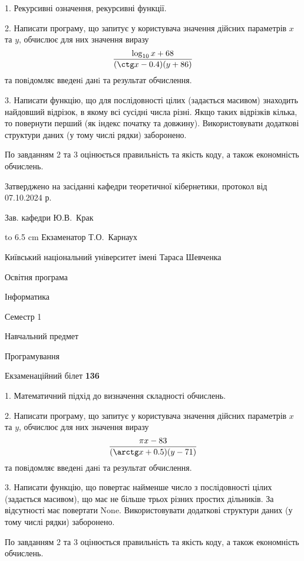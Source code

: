 \documentclass[12pt, ukrainian]{article}
\begin{document}
{%
1. Рекурсивні означення, рекурсивні функції.%
\par
2. Написати програму, що запитує у користувача значення дійсних параметрів $x$ та $y$, обчислює для них значення виразу 
$$\frac{\log_{10} x + 68}{(\ctg x - 0.4) (y + 86)}$$ 
та повiдомляє введенi данi та результат обчислення.

\par
3. Написати функцію, що для послідовності цілих (задається масивом) знаходить найдовший відрізок, в якому всі сусідні числа різні. Якщо таких відрізків кілька, то повернути перший (як індекс початку та довжину). Використовувати додаткові структури даних (у тому числі рядки) заборонено.

По завданням 2 та 3 оцінюється правильність та якість коду, а також економність обчислень.

}
{\smallskip\smallskip \begin {scriptsize} Затверджено на засіданні кафедри теоретичної кібернетики, протокол   від   07.10.2024 р.\par\smallskip\smallskip\smallskip\smallskip
{\parbox {6.5 cm} {Зав. кафедри \dotfill Ю.В.~Крак}}\hspace {0.7cm} {\hbox to 6.5 cm { Екзаменатор \dotfill Т.О.~Карнаух}} \end{scriptsize}}
\newpage
{{\begin {scriptsize}\par
{ \center  Київський національний університет імені Тараса Шевченка \par}
{\parbox {5 cm}{Освітня програма \hfill}{\parbox {7 cm}{Інформатика\hfill}}\parbox {6 cm}{\hfill Семестр 1}}\par
{\parbox {5 cm} {Навчальний предмет \hfill}\parbox {7 cm}{Програмування \hfill}\parbox {6cm}{\hfill}\par}\vspace{-15pt} \end{scriptsize}}{\center Екзаменаційний білет \No \textbf { 136 }\par}}
{%
1. Математичний підхід до визначення складності обчислень.%
\par
2. Написати програму, що запитує у користувача значення дійсних параметрів $x$ та $y$, обчислює для них значення виразу 
$$\frac{\pi x - 83}{(\arctg x + 0.5) (y - 71)}$$ 
та повiдомляє введенi данi та результат обчислення.

\par
3. Написати функцію, що повертає найменше число з послідовності цілих (задається масивом), що має не більше трьох різних простих дільників. За відсутності має повертати None. Використовувати додаткові структури даних (у тому числі рядки) заборонено.

По завданням 2 та 3 оцінюється правильність та якість коду, а також економність обчислень.

}
\end{document}
